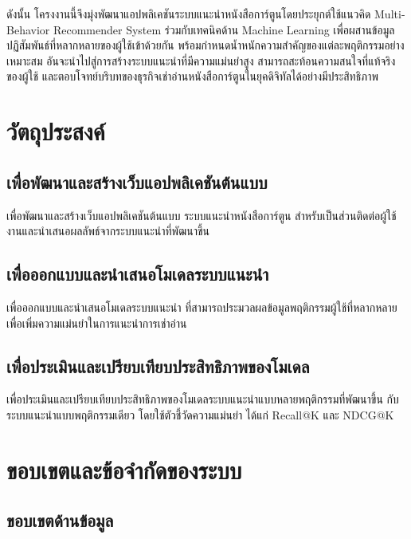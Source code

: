 ดังนั้น โครงงานนี้จึงมุ่งพัฒนาแอปพลิเคชันระบบแนะนำหนังสือการ์ตูนโดยประยุกต์ใช้แนวคิด Multi-Behavior Recommender System ร่วมกับเทคนิคด้าน Machine Learning เพื่อผสานข้อมูลปฏิสัมพันธ์ที่หลากหลายของผู้ใช้เข้าด้วยกัน พร้อมกำหนดน้ำหนักความสำคัญของแต่ละพฤติกรรมอย่างเหมาะสม อันจะนำไปสู่การสร้างระบบแนะนำที่มีความแม่นยำสูง สามารถสะท้อนความสนใจที่แท้จริงของผู้ใช้ และตอบโจทย์บริบทของธุรกิจเช่าอ่านหนังสือการ์ตูนในยุคดิจิทัลได้อย่างมีประสิทธิภาพ

\section{วัตถุประสงค์}

\subsection{เพื่อพัฒนาและสร้างเว็บแอปพลิเคชันต้นแบบ}
เพื่อพัฒนาและสร้างเว็บแอปพลิเคชันต้นแบบ ระบบแนะนำหนังสือการ์ตูน สำหรับเป็นส่วนติดต่อผู้ใช้งานและนำเสนอผลลัพธ์จากระบบแนะนำที่พัฒนาขึ้น

\subsection{เพื่อออกแบบและนำเสนอโมเดลระบบแนะนำ}
เพื่อออกแบบและนำเสนอโมเดลระบบแนะนำ ที่สามารถประมวลผลข้อมูลพฤติกรรมผู้ใช้ที่หลากหลาย เพื่อเพิ่มความแม่นยำในการแนะนำการเช่าอ่าน

\subsection{เพื่อประเมินและเปรียบเทียบประสิทธิภาพของโมเดล}
เพื่อประเมินและเปรียบเทียบประสิทธิภาพของโมเดลระบบแนะนำแบบหลายพฤติกรรมที่พัฒนาขึ้น กับระบบแนะนำแบบพฤติกรรมเดียว โดยใช้ตัวชี้วัดความแม่นยำ ได้แก่ Recall@K และ NDCG@K

\section{ขอบเขตและข้อจำกัดของระบบ}

\subsection{ขอบเขตด้านข้อมูล}


